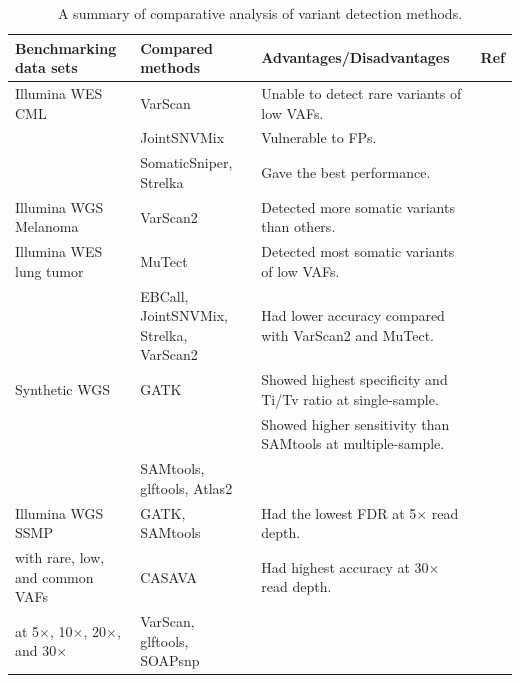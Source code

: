 \documentclass[a4,center,fleqn]{NAR}
\begin{document}
\begin{landscape}
\begin{table}[htbp]
  \centering
  \small
  \caption{A summary of comparative analysis of variant detection methods.}\label{tbl:comparison}
  \begin{threeparttable}
    \begin{tabular}{rlrr}
    \multicolumn{1}{l}{\textbf{Benchmarking data sets}} & \textbf{Compared methods} & \multicolumn{1}{l}{\textbf{Advantages/Disadvantages}} & \multicolumn{1}{l}{\textbf{Ref}} \\
    \toprule
    \multicolumn{1}{l}{Illumina WES  CML} & VarScan & \multicolumn{1}{l}{Unable to detect rare variants of low VAFs.} &~\citep{Roberts2013} \\
          & JointSNVMix & \multicolumn{1}{l}{Vulnerable to FPs.} &  \\
          & SomaticSniper, Strelka & \multicolumn{1}{l}{Gave the best performance.} &  \\

    \midrule
    \multicolumn{1}{l}{Illumina WGS Melanoma } & VarScan2 & \multicolumn{1}{l}{Detected more somatic variants than others.} &~\citep{wang2013detecting} \\
    \multicolumn{1}{l}{Illumina WES lung tumor} & MuTect & \multicolumn{1}{l}{Detected most somatic variants of low VAFs.} &  \\
          & EBCall, JointSNVMix, Strelka, VarScan2 & \multicolumn{1}{l}{Had lower accuracy compared with VarScan2 and MuTect.} &  \\

    \midrule
    \multicolumn{1}{l}{Synthetic WGS} & GATK  & \multicolumn{1}{l}{Showed highest specificity and Ti/Tv ratio at single-sample. } &~\citep{liu2013variant}\\
          &       & \multicolumn{1}{l}{Showed higher sensitivity than SAMtools at multiple-sample.} &  \\
          & SAMtools, glftools, Atlas2 &       &  \\

    \midrule
    \multicolumn{1}{l}{Illumina WGS SSMP} & GATK, SAMtools & \multicolumn{1}{l}{Had the lowest FDR at 5$\times$ read depth.} &~\citep{Cheng2014}\\
    \multicolumn{1}{l}{with rare, low, and common VAFs} & CASAVA & \multicolumn{1}{l}{Had highest accuracy at 30$\times$ read depth.} &  \\
    \multicolumn{1}{l}{at 5$\times$, 10$\times$, 20$\times$, and 30$\times$ } & VarScan, glftools, SOAPsnp &       &  \\


\end{tabular}
\end{threeparttable}
\end{table}
\end{landscape}
\end{document}
